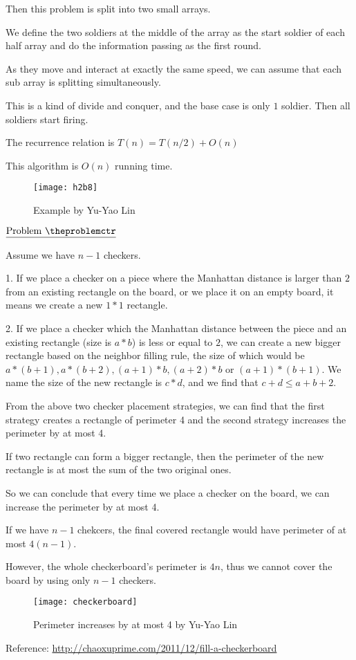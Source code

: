 \documentclass[11pt]{article}
\def\pp{\par\noindent}
\begin{document}
Then this problem is split into two small arrays.

We define the two soldiers at the middle of the array as the start soldier of each half array and do the information passing as the first round.

As they move and interact at exactly the same speed, we can assume that each sub array is splitting simultaneously.

This is a kind of divide and conquer, and the base case is only $1$ soldier. Then all soldiers start firing.

The recurrence relation is $T(n) = T(n/2)+O(n)$

This algorithm is $O(n)$ running time.

\begin{figure}[htpb]
\centering
\texttt{[image: h2b8]}
\caption{Example by Yu-Yao Lin}
\end{figure}

\vfill
\newpage
\addtocounter{problemctr}{1}
\bigskip
\noindent
$\underline{\rm Problem\ \theproblemctr}$\pp

\noindent
Assume we have $n-1$ checkers.

1. If we place a checker on a piece where the Manhattan distance is larger than $2$ from an existing rectangle on the board, or we place it on an empty board, it means we create a new $1*1$ rectangle.

2. If we place a checker which the Manhattan distance between the piece and an existing rectangle (size is $a*b$) is less or equal to $2$, we can create a new bigger rectangle based on the neighbor filling rule, the size of which would be $a*(b+1), a*(b+2), (a+1)*b, (a+2)*b$ or $(a+1)*(b+1)$. We name the size of the new rectangle is $c*d$, and we find that $c+d \le a+b+2$.

From the above two checker placement strategies, we can find that the first strategy creates a rectangle of perimeter 4 and the second strategy increases the perimeter by at most 4.

If two rectangle can form a bigger rectangle, then the perimeter of the new rectangle is at most the sum of the two original ones.

So we can conclude that every time we place a checker on the board, we can increase the perimeter by at most 4.

If we have $n-1$ chekcers, the final covered rectangle would have perimeter of at most $4(n-1)$.

However, the whole checkerboard's perimeter is $4n$, thus we cannot cover the board by using only $n-1$ checkers.

\begin{figure}[htpb]
\centering
\texttt{[image: checkerboard]}
\caption{Perimeter increases by at most 4 by Yu-Yao Lin}
\end{figure}

\bigskip
Reference: \url{http://chaoxuprime.com/2011/12/fill-a-checkerboard}
\end{document}
